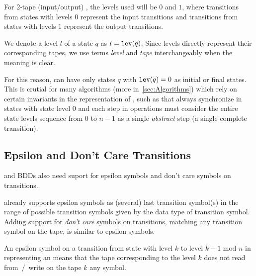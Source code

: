 For 2-tape (input/output) \nft, the levels used will be $0$ and $1$, where transitions from states with levels $0$ represent the input transitions and transitions from states with levels $1$ represent the output transitions.

We denote a level $l$ of a state $q$ as $l = \texttt{lev}(q)$.
Since levels directly represent their corresponding tapes, we use terms \emph{level} and \emph{tape} interchangeably when the meaning is clear.

For this reason, \nfts can have only states $q$ with $\texttt{lev}(q) = 0$ as initial or final states.
This is crutial for many algorithms (more in~\ref{sec:Algorithms}) which rely on certain invariants in the representation of \nfts, such as that \nfts always synchronize in states with state level $0$ and each step in operations must consider the entire state levels sequence from $0$ to $n-1$ as a single \emph{abstract} step (a single complete \nft transition).

\subsection{Epsilon and Don't Care Transitions}

\nfts and BDDs also need suport for epsilon symbols and don't care symbols on transitions.

\mata already supports epsilon symbols as (several) last transition symbol(s) in the range of possible transition symbols given by the data type of transition symbol.
Adding support for \emph{don't care} symbols on transitions, matching any transition symbol on the tape, is similar to epsilon symbols.

An epsilon symbol on a transition from state with level $k$ to level $k + 1 \text{ mod } n$ in \nfaClass representing an \nft means that the tape corresponding to the level $k$ does not read from~/~write on the tape $k$ any symbol.

